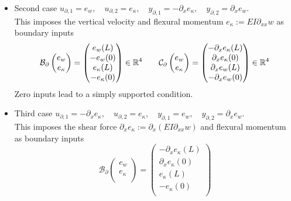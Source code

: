 \begin{itemize}
	\item {Second case} ${u}_{\partial, 1} = e_w, \quad {u}_{\partial, 2} = e_\kappa, \quad {y}_{\partial, 1} = -\partial_{x}e_\kappa, \quad {y}_{\partial, 2} = \partial_x e_w$. \\
	This imposes the vertical velocity and flexural momentum $e_\kappa:= EI \partial_{xx} w$ as boundary inputs
	\begin{equation}
	\mathcal{B}_\partial \begin{pmatrix}
	e_w \\ e_\kappa \\
	\end{pmatrix} = \begin{pmatrix}
	e_w(L) \\ -e_w(0) \\ e_\kappa(L) \\ -e_\kappa(0) \\
	\end{pmatrix} \in \mathbb{R}^4 \qquad 
	\mathcal{C}_\partial \begin{pmatrix}
	e_w \\ e_\kappa \\ 
	\end{pmatrix} = \begin{pmatrix}
	-\partial_x e_\kappa(L) \\ \partial_x e_\kappa(0) \\  \partial_x e_w(L) \\ -\partial_x e_w(0)
	\end{pmatrix} \in \mathbb{R}^4
	\end{equation}
	 Zero inputs lead to a simply supported condition.
	\item {Third case} ${u}_{\partial, 1} = -\partial_{x}e_\kappa , \quad {u}_{\partial, 2} = e_\kappa, \quad {y}_{\partial, 1} = e_w, \quad {y}_{\partial, 2} = \partial_x e_w$. \\
	This imposes the shear force $\partial_{x}e_\kappa:= \partial_{x}(EI \partial_{xx}w)$ and flexural momentum as boundary inputs
	\begin{equation}
	\mathcal{B}_\partial \begin{pmatrix}
	e_w \\ e_\kappa \\
	\end{pmatrix} = \begin{pmatrix}
	 -\partial_x e_\kappa(L) \\  \partial_x e_\kappa(0) \\ e_\kappa(L) \\ -e_\kappa(0) \\

\end{pmatrix}
\end{equation}
\end{itemize}
